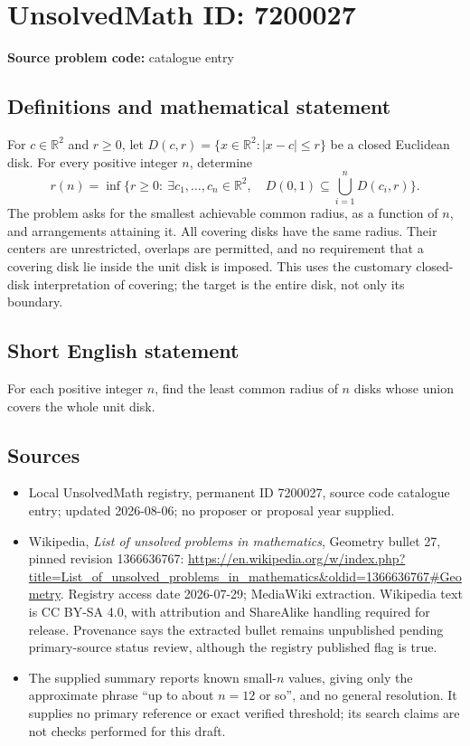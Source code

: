 \documentclass[11pt]{article}
\newcommand{\R}{\mathbb{R}}
\begin{document}
\section*{UnsolvedMath ID: 7200027}
\textbf{Source problem code:} catalogue entry
\subsection{Definitions and mathematical statement}
For \(c\in\R^2\) and \(r\geq0\), let \(D(c,r)=\{x\in\R^2:|x-c|\leq r\}\) be a closed Euclidean disk. For every positive integer \(n\), determine
\[
 r(n)=\inf\{r\geq0:\ \exists c_1,\ldots,c_n\in\R^2,\quad
 D(0,1)\subseteq\bigcup_{i=1}^n D(c_i,r)\}.
\]
The problem asks for the smallest achievable common radius, as a function of \(n\), and arrangements attaining it. All covering disks have the same radius. Their centers are unrestricted, overlaps are permitted, and no requirement that a covering disk lie inside the unit disk is imposed. This uses the customary closed-disk interpretation of covering; the target is the entire disk, not only its boundary.
\subsection{Short English statement}
For each positive integer \(n\), find the least common radius of \(n\) disks whose union covers the whole unit disk.
\subsection{Sources}
\begin{itemize}
\item Local UnsolvedMath registry, permanent ID 7200027, source code catalogue entry; updated 2026-08-06; no proposer or proposal year supplied.
\item Wikipedia, \emph{List of unsolved problems in mathematics}, Geometry bullet 27, pinned revision 1366636767: \url{https://en.wikipedia.org/w/index.php?title=List_of_unsolved_problems_in_mathematics&oldid=1366636767#Geometry}. Registry access date 2026-07-29; MediaWiki extraction. Wikipedia text is CC BY-SA 4.0, with attribution and ShareAlike handling required for release. Provenance says the extracted bullet remains unpublished pending primary-source status review, although the registry published flag is true.
\item The supplied summary reports known small-\(n\) values, giving only the approximate phrase ``up to about \(n=12\) or so'', and no general resolution. It supplies no primary reference or exact verified threshold; its search claims are not checks performed for this draft.
\end{itemize}
\end{document}
